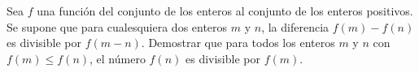 Sea $f$ una función del conjunto de los enteros al conjunto de los enteros positivos. Se supone que para cualesquiera dos enteros $m$ y $n$, la diferencia $f (m) - f (n)$ es divisible por $f (m - n).$ Demostrar que para todos los enteros $m$ y $n$ con $f(m) \leq f(n)$, el número $f(n)$ es divisible por $f(m)$.